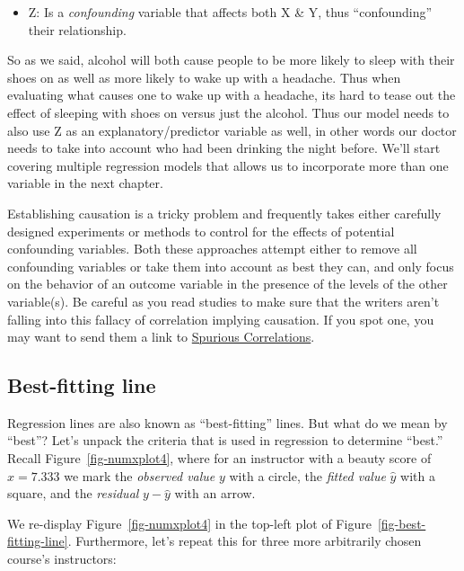 \documentclass[
  letterpaper,
  DIV=11,
  numbers=noendperiod]{scrreprt}
\providecommand{\tightlist}{%
  \setlength{\itemsep}{0pt}\setlength{\parskip}{0pt}}\usepackage{longtable,booktabs,array}
\theoremstyle{definition}
\theoremstyle{remark}
\begin{document}
\begin{itemize}
\tightlist
\item
  Z: Is a \emph{confounding} variable that affects both X \& Y, thus
  ``confounding'' their relationship.
\end{itemize}

So as we said, alcohol will both cause people to be more likely to sleep
with their shoes on as well as more likely to wake up with a headache.
Thus when evaluating what causes one to wake up with a headache, its
hard to tease out the effect of sleeping with shoes on versus just the
alcohol. Thus our model needs to also use Z as an explanatory/predictor
variable as well, in other words our doctor needs to take into account
who had been drinking the night before. We'll start covering multiple
regression models that allows us to incorporate more than one variable
in the next chapter.

Establishing causation is a tricky problem and frequently takes either
carefully designed experiments or methods to control for the effects of
potential confounding variables. Both these approaches attempt either to
remove all confounding variables or take them into account as best they
can, and only focus on the behavior of an outcome variable in the
presence of the levels of the other variable(s). Be careful as you read
studies to make sure that the writers aren't falling into this fallacy
of correlation implying causation. If you spot one, you may want to send
them a link to
\href{http://www.tylervigen.com/spurious-correlations}{Spurious
Correlations}.

\hypertarget{sec-leastsquares}{%
\subsection{Best-fitting line}\label{sec-leastsquares}}

Regression lines are also known as ``best-fitting'' lines. But what do
we mean by ``best''? Let's unpack the criteria that is used in
regression to determine ``best.'' Recall Figure~\ref{fig-numxplot4},
where for an instructor with a beauty score of \(x = 7.333\) we mark the
\emph{observed value} \(y\) with a circle, the \emph{fitted value}
\(\widehat{y}\) with a square, and the \emph{residual}
\(y - \widehat{y}\) with an arrow.

We re-display Figure~\ref{fig-numxplot4} in the top-left plot of
Figure~\ref{fig-best-fitting-line}. Furthermore, let's repeat this for
three more arbitrarily chosen course's instructors:
\end{document}
